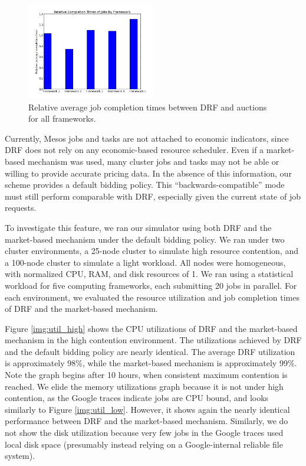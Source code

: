 \documentclass{acm_proc_article-sp}
\begin{document}
\begin{figure}

\includegraphics[width=0.5\textwidth]{images/relative_completion_times.png}
\caption{Relative average job completion times between DRF and auctions for all frameworks.}
\label{img:relative}
\end{figure}

Currently, Mesos jobs and tasks are not attached to economic indicators, since DRF does not rely on any economic-based resource scheduler. Even if a market-based mechanism was used, many cluster jobs and tasks may not be able or willing to provide accurate pricing data. In the absence of this information, our scheme provides a default bidding policy. This ``backwards-compatible'' mode must still perform comparable with DRF, especially given the current state of job requests.

To investigate this feature, we ran our simulator using both DRF and the market-based mechanism under the default bidding policy. We ran under two cluster environments, a 25-node cluster to simulate high resource contention, and a 100-node cluster to simulate a light workload. All nodes were homogeneous, with normalized CPU, RAM, and disk resources of 1. We ran using a statistical workload for five computing frameworks, each submitting 20 jobs in parallel. For each environment, we evaluated the resource utilization and job completion times of DRF and the market-based mechanism.

Figure \ref{img:util_high} shows the CPU utilizations of DRF and the market-based mechanism in the high contention environment.  The utilizations achieved by DRF and the default bidding policy are nearly identical. The average DRF utilization is approximately 98\%, while the market-based mechanism is approximately 99\%. Note the graph begins after 10 hours, when consistent maximum contention is reached. We elide the memory utilizations graph because it is not under high contention, as the Google traces indicate jobs are CPU bound, and looks similarly to Figure \ref{img:util_low}. However, it shows again the nearly identical performance between DRF and the market-based mechanism. Similarly, we do not show the disk utilization because very few jobs in the Google traces used local disk space (presumably instead relying on a Google-internal reliable file system).
\end{document}
